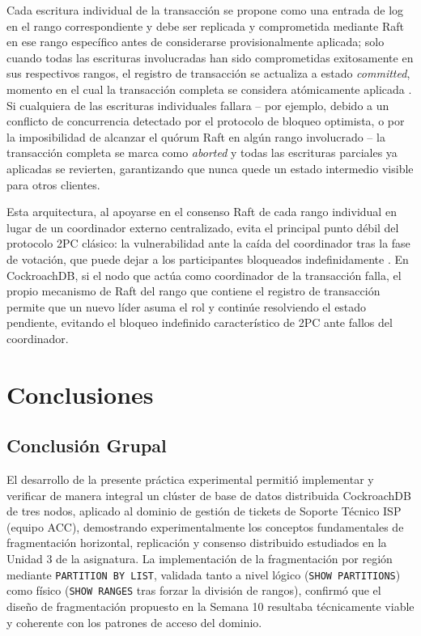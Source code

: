 \documentclass[12pt, a4paper]{article}
\begin{document}
Cada escritura individual de la transacción se propone como una entrada de log en el rango correspondiente y debe ser replicada y comprometida mediante Raft en ese rango específico antes de considerarse provisionalmente aplicada; solo cuando todas las escrituras involucradas han sido comprometidas exitosamente en sus respectivos rangos, el registro de transacción se actualiza a estado \textit{committed}, momento en el cual la transacción completa se considera atómicamente aplicada \cite{taft2020cockroachdb}. Si cualquiera de las escrituras individuales fallara -- por ejemplo, debido a un conflicto de concurrencia detectado por el protocolo de bloqueo optimista, o por la imposibilidad de alcanzar el quórum Raft en algún rango involucrado -- la transacción completa se marca como \textit{aborted} y todas las escrituras parciales ya aplicadas se revierten, garantizando que nunca quede un estado intermedio visible para otros clientes.

Esta arquitectura, al apoyarse en el consenso Raft de cada rango individual en lugar de un coordinador externo centralizado, evita el principal punto débil del protocolo 2PC clásico: la vulnerabilidad ante la caída del coordinador tras la fase de votación, que puede dejar a los participantes bloqueados indefinidamente \cite{ozsu2020principles}. En CockroachDB, si el nodo que actúa como coordinador de la transacción falla, el propio mecanismo de Raft del rango que contiene el registro de transacción permite que un nuevo líder asuma el rol y continúe resolviendo el estado pendiente, evitando el bloqueo indefinido característico de 2PC ante fallos del coordinador.

\section{Conclusiones}
\label{conclusiones}

\subsection{Conclusión Grupal}

El desarrollo de la presente práctica experimental permitió implementar y verificar de manera integral un clúster de base de datos distribuida CockroachDB de tres nodos, aplicado al dominio de gestión de tickets de Soporte Técnico ISP (equipo ACC), demostrando experimentalmente los conceptos fundamentales de fragmentación horizontal, replicación y consenso distribuido estudiados en la Unidad 3 de la asignatura. La implementación de la fragmentación por región mediante \texttt{PARTITION BY LIST}, validada tanto a nivel lógico (\texttt{SHOW PARTITIONS}) como físico (\texttt{SHOW RANGES} tras forzar la división de rangos), confirmó que el diseño de fragmentación propuesto en la Semana 10 resultaba técnicamente viable y coherente con los patrones de acceso del dominio.
\end{document}
